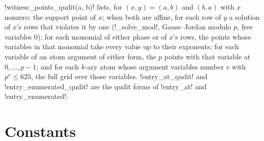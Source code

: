 \py!witness_points_qudit(a, b)! lists, for $(x,y)=(a,b)$ and $(b,a)$ with $x$ nonzero: the support point of $x$; when both are affine, for each row of $y$ a solution of $x$'s rows that violates it by one (\py!_solve_mod!, Gauss--Jordan modulo $p$, free variables $0$); for each monomial of either phase or of $x$'s rows, the points whose variables in that monomial take every value up to their exponents; for each variable of an atom argument of either form, the $p$ points with that variable at $0,\ldots,p-1$; and for each $k$-ary atom whose argument variables number $v$ with $p^v\le625$, the full grid over those variables. \py!entry_at_qudit! and \py!entry_enumerated_qudit! are the qudit forms of \py!entry_at! and \py!entry_enumerated!.

\section{Constants}\label{sec:algebra-constants-sec}

